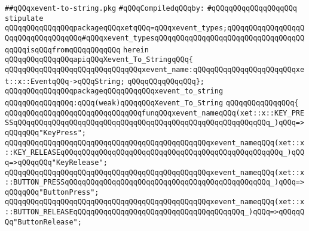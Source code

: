 \label{src/lib/x-kit/xclient/src/to-string/xevent-to-string.pkg}
\verb|##qQQqxevent-to-string.pkg|\newline
\newline
\verb|#qQQqCompiledqQQqby:|\newline
\verb|#qQQqqQQqqQQqqQQqqQQq|\newline
\newline
\newline
\verb|stipulate|\newline
\verb|qQQqqQQqqQQqqQQqpackageqQQqxetqQQq=qQQqxevent_types;qQQqqQQqqQQqqQQqqQQqqQQqqQQqqQQqqQQq#qQQqxevent_typesqQQqqQQqqQQqqQQqqQQqqQQqqQQqqQQqqQQqqQQqisqQQqfromqQQqqQQqqQQq|\newline
\verb|herein|\newline
\newline
\verb|qQQqqQQqqQQqqQQqapiqQQqXevent_To_StringqQQq{|\newline
\verb|qQQqqQQqqQQqqQQqqQQqqQQqqQQqqQQqxevent_name:qQQqqQQqqQQqqQQqqQQqqQQqxet::x::EventqQQq->qQQqString;|\newline
\verb|qQQqqQQqqQQqqQQq};|\newline
\newline
\newline
\verb|qQQqqQQqqQQqqQQqpackageqQQqqQQqqQQqxevent_to_string|\newline
\verb|qQQqqQQqqQQqqQQq:qQQq(weak)qQQqqQQqXevent_To_String|\newline
\verb|qQQqqQQqqQQqqQQq{|\newline
\verb|qQQqqQQqqQQqqQQqqQQqqQQqqQQqqQQqfunqQQqxevent_nameqQQq(xet::x::KEY_PRESSqQQqqQQqqQQqqQQqqQQqqQQqqQQqqQQqqQQqqQQqqQQqqQQqqQQqqQQqqQQq_)qQQq=>qQQqqQQq"KeyPress";|\newline
\verb|qQQqqQQqqQQqqQQqqQQqqQQqqQQqqQQqqQQqqQQqqQQqqQQqxevent_nameqQQq(xet::x::KEY_RELEASEqQQqqQQqqQQqqQQqqQQqqQQqqQQqqQQqqQQqqQQqqQQqqQQqqQQq_)qQQq=>qQQqqQQq"KeyRelease";|\newline
\verb|qQQqqQQqqQQqqQQqqQQqqQQqqQQqqQQqqQQqqQQqqQQqqQQqxevent_nameqQQq(xet::x::BUTTON_PRESSqQQqqQQqqQQqqQQqqQQqqQQqqQQqqQQqqQQqqQQqqQQqqQQq_)qQQq=>qQQqqQQq"ButtonPress";|\newline
\verb|qQQqqQQqqQQqqQQqqQQqqQQqqQQqqQQqqQQqqQQqqQQqqQQqxevent_nameqQQq(xet::x::BUTTON_RELEASEqQQqqQQqqQQqqQQqqQQqqQQqqQQqqQQqqQQqqQQq_)qQQq=>qQQqqQQq"ButtonRelease";|\newline
